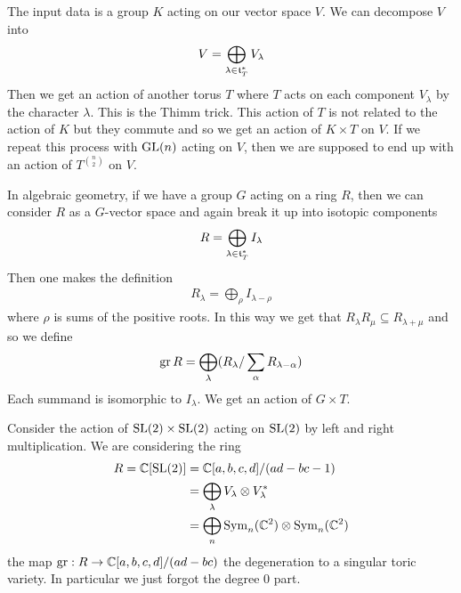 \documentclass[12pt]{article}
\begin{document}
\hfill

The input data is a group $K$ acting on our vector space $V$. We can decompose $V$ into 
 \begin{align*}
    V = \bigoplus_{\lambda \in \mathfrak{t}_T^*} V_\lambda
\end{align*} Then we get an action of another torus $T$ where $T$ acts on each component $V_\lambda$ by the character
$\lambda$. This is the Thimm trick. This action of $T$ is not related to the action of $K$ but they commute and so we get an action of 
$K\times T$ on $V$. If we repeat this process with $\operatorname{GL}(n)$ acting on $V$, then we are 
supposed to end up with an action of $T^{\binom{n}{2}}$ on $V$. 

\hfill

In algebraic geometry, if we have a group $G$ acting on a ring $R$, then we 
can consider $R$ as a $G$-vector space and again break it up into isotopic components \begin{align*}
    R = \bigoplus_{\lambda \in \mathfrak{t}_T^*} I_\lambda
\end{align*} Then one makes the definition
\begin{align*}
    R_\lambda = \bigoplus_{\rho} I_{\lambda - \rho}
\end{align*} where $\rho$ is sums of the positive roots.
In this way we get that $R_\lambda R_\mu \subseteq R_{\lambda + \mu}$ and so we define \begin{align*}
    \operatorname{gr} R = \bigoplus_{\lambda} (R_\lambda/\sum_\alpha R_{\lambda - \alpha})
\end{align*} Each summand is isomorphic to $I_\lambda$. We get an action of $G\times T$.

\begin{example}
    Consider the action of $\operatorname{SL}(2)\times \operatorname{SL}(2)$ acting on $\operatorname{SL}(2)$ by left and right multiplication.
    We are considering the ring \begin{align*}
        R = \mathbb{C}[\operatorname{SL}(2)] &= \mathbb{C}[a,b,c,d]/(ad - bc - 1) \\
        &= \bigoplus_\lambda V_\lambda \otimes V_{\lambda}^* \\
        &= \bigoplus_n \operatorname{Sym}_n(\mathbb{C}^2) \otimes \operatorname{Sym}_n(\mathbb{C}^2)
    \end{align*} the map $\operatorname{gr}: R\to \mathbb{C}[a,b,c,d]/(ad - bc)$ the degeneration 
    to a singular toric variety. In particular we just forgot the degree $0$ part.
\end{example}
\end{document}
